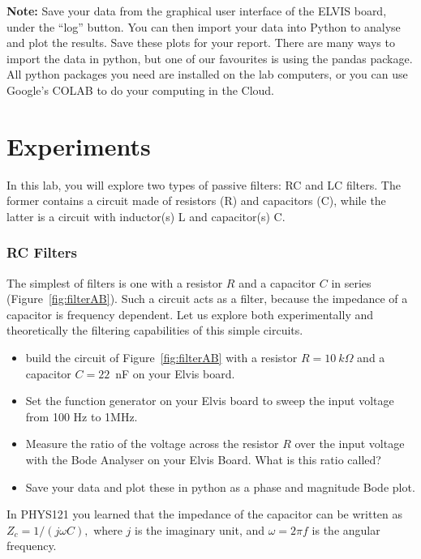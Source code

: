 \documentclass{article}
\begin{document}
\noindent\textbf{Note:} Save
your data from the graphical user interface of the ELVIS board, under
the ``log'' button. You can then import your data into Python to
analyse and plot the results. Save these plots for your report. There
are many ways to import the data in python, but one of our favourites
is using the pandas package. All python packages you need are
installed on the lab computers, or you can use Google's COLAB to do
your computing in the Cloud.

\section*{Experiments}
In this lab, you will explore two types of passive filters: RC and LC
filters. The former contains a circuit made of resistors (R) and
capacitors (C), while the latter is a circuit with inductor(s) L and
capacitor(s) C. 

\subsubsection*{RC Filters}
The simplest of filters is one with a resistor $R$ and a capacitor $C$
in series (Figure~\ref{fig:filterAB}). Such a circuit acts as a
filter, because the impedance of a capacitor is frequency
dependent. Let us explore both experimentally and theoretically the
filtering capabilities of this simple circuits.

\begin{itemize}
\item build the circuit of Figure~\ref{fig:filterAB} with a resistor
  $R=10~k\Omega$ and a capacitor $C=22$~nF on your Elvis board.
\item Set the function generator on your Elvis board to sweep the
  input voltage from 100 Hz to 1MHz. 
\item Measure the ratio of the voltage across the resistor $R$ over
  the input voltage with the Bode Analyser on your Elvis Board. What
  is this ratio called?
\item Save your data and plot these in python as a phase and
  magnitude Bode plot.
\end{itemize}

In PHYS121 you learned that the impedance of the capacitor can be
written as $Z_c= 1/(j\omega C),$ where $j$ is the imaginary unit, and
$\omega = 2\pi f$ is the angular frequency.
\end{document}
